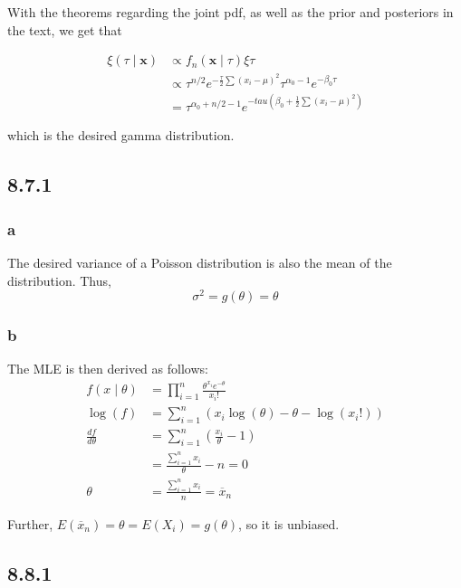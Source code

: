 \documentclass[12pt,letterpaper]{article}
\theoremstyle{definition}
\begin{document}
With the theorems regarding the joint pdf, as well as the prior and posteriors
in the text, we get that

\begin{align*}
  \xi(\tau \mid \mathbf{x}) &\propto f_n(\mathbf{x} \mid \tau)\xi{\tau} \\
                            &\propto \tau^{n/2}e^{-\frac{\tau}{2}\sum(x_i - \mu)^2}\tau^{\alpha_0-1}e^{-\beta_0\tau} \\
                            &= \tau^{\alpha_0 + n/2 - 1}e^{-tau(\beta_0 + \frac{1}{2}\sum(x_i-\mu)^2)}
\end{align*}

which is the desired gamma distribution.

\subsection*{8.7.1}

\subsubsection*{a}

The desired variance of a Poisson distribution is also the mean of the
distribution. Thus,
\[
  \sigma^2 = g(\theta) = \theta
\]

\subsubsection*{b}

The MLE is then derived as follows:
\begin{align*}
  f(x \mid \theta) &= \prod_{i=1}^n\frac{\theta^{x_i}e^{-\theta}}{x_i!} \\
  \log(f) &= \sum_{i=1}^n(x_i\log(\theta) - \theta - \log(x_i!)) \\
  \frac{df}{d\theta} &= \sum_{i=1}^n(\frac{x_i}{\theta} - 1) \\
                   &= \frac{\sum_{i=1}^nx_i}{\theta} - n = 0\\
  \theta &= \frac{\sum_{i=1}^nx_i}{n} = \overline{x}_n
\end{align*}

Further, $E(\overline{x}_n) = \theta = E(X_i) = g(\theta)$, so it is unbiased.

\subsection*{8.8.1}
\end{document}
